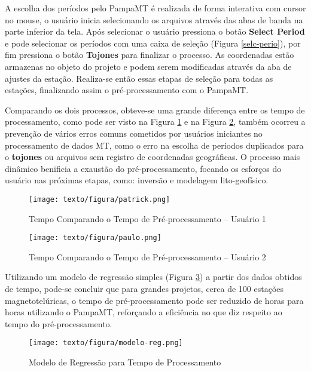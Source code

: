     A escolha dos períodos pelo PampaMT é realizada de forma interativa com cursor no mouse, o usuário inicia selecionando os arquivos  através das abas de banda na parte inferior da tela. Após selecionar o usuário pressiona o botão \textbf{Select Period} e pode selecionar os períodos com uma caixa de seleção (Figura \ref{selc-perio}), por fim pressiona o botão \textbf{Tojones} para finalizar o processo. As coordenadas estão armazenas no objeto do projeto e podem serem modificadas através da aba de ajustes da estação. Realiza-se então essas etapas de seleção para todas as estações, finalizando assim o pré-processamento com o PampaMT.
    
    Comparando os dois processos, obteve-se uma grande diferença entre os tempo de processamento, como pode ser visto na Figura \ref{tempo-pa} e na Figura \ref{tempo-pau}, também ocorreu a prevenção de vários erros comuns cometidos por usuários iniciantes no processamento de dados MT, como o erro na escolha de períodos duplicados para o \textbf{tojones} ou arquivos sem registro de coordenadas geográficas. O processo mais dinâmico benificia a exaustão do pré-processamento, focando os esforços do usuário nas próximas etapas, como: inversão e modelagem lito-geofísico. 
        
    
    \begin{figure}[H]
        \caption{Tempo Comparando o Tempo de Pré-processamento -- Usuário 1}
            \begin{center}
                \texttt{[image: texto/figura/patrick.png]}
            \end{center}
        \legend{\Fonte{\oautor}}
        \label{tempo-pa}
    \end{figure}
    
    \begin{figure}[H]
        \caption{Tempo Comparando o Tempo de Pré-processamento -- Usuário 2}
            \begin{center}
                \texttt{[image: texto/figura/paulo.png]}
            \end{center}
        \legend{\Fonte{\oautor}}
        \label{tempo-pau}
    \end{figure}
    
    
    Utilizando um modelo de regressão simples (Figura \ref{modelo-reg}) a partir dos dados obtidos de tempo, pode-se concluir que para grandes projetos, cerca de 100 estações magnetotelúricas, o tempo de pré-processamento pode ser reduzido de  horas para  horas utilizando o PampaMT, reforçando a eficiência no que diz respeito ao tempo do pré-processamento.   
    
    \begin{figure}[H]
        \caption{Modelo de Regressão para Tempo de Processamento}
            \begin{center}
                \texttt{[image: texto/figura/modelo-reg.png]}
            \end{center}
        \legend{\Fonte{\oautor}}
        \label{modelo-reg}
    \end{figure}      
        
